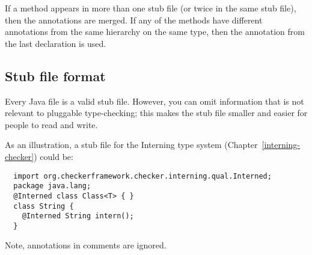 If a method appears in more than one stub file (or twice in the same
stub file), then the annotations are merged. If any of the
methods have different annotations from the same hierarchy on the same type,
then the annotation from the last declaration is used.




\subsection{Stub file format\label{stub-format}}

Every Java file is a valid stub file.  However, you can omit information
that is not relevant to pluggable type-checking; this makes the stub file
smaller and easier for people to read and write.

As an illustration, a stub file for the Interning type system
(Chapter~\ref{interning-checker}) could be:

\begin{Verbatim}
  import org.checkerframework.checker.interning.qual.Interned;
  package java.lang;
  @Interned class Class<T> { }
  class String {
    @Interned String intern();
  }
\end{Verbatim}

Note, annotations in comments are ignored.

